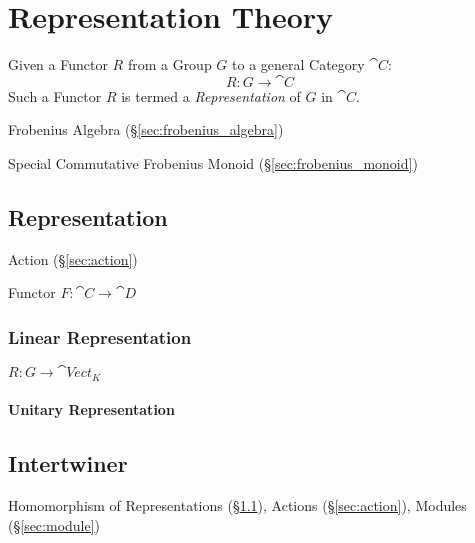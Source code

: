 \section{Representation Theory}\label{sec:representation_theory}

Given a Functor $R$ from a Group $G$ to a general Category
$\cat{C}$:
\[
    R : G \rightarrow \cat{C}
\]
Such a Functor $R$ is termed a \emph{Representation} of $G$ in
$\cat{C}$.

Frobenius Algebra (\S\ref{sec:frobenius_algebra})

Special Commutative Frobenius Monoid (\S\ref{sec:frobenius_monoid})



\subsection{Representation}\label{sec:representation}

Action (\S\ref{sec:action})

Functor $F : \cat{C} \rightarrow \cat{D}$



\subsubsection{Linear Representation}\label{sec:linear_representation}

$R : G \rightarrow \cat{Vect}_K$



\paragraph{Unitary Representation}\label{sec:unitary_representation}



\subsection{Intertwiner}\label{sec:intertwiner}

Homomorphism of Representations (\S\ref{sec:representation}), Actions
(\S\ref{sec:action}), Modules (\S\ref{sec:module})



